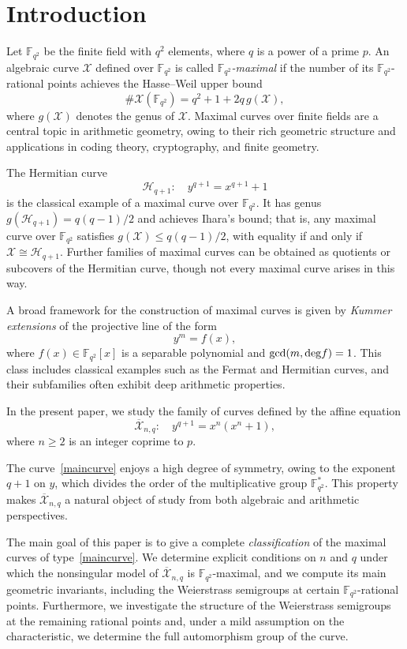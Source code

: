 \documentclass[12pt]{amsart}
\theoremstyle{remark}
\theoremstyle{definition}
\def\cX{\mathcal X}
\def\deg{{\rm deg}}
\begin{document}
	\section{Introduction}
	
	Let $\mathbb{F}_{q^2}$ be the finite field with $q^2$ elements, where 
$q$ is a power of a prime $p$. An algebraic curve $\cX$ defined over 
$\mathbb{F}_{q^2}$ is called \emph{$\mathbb{F}_{q^2}$-maximal} if the 
number of its $\mathbb{F}_{q^2}$-rational points achieves the 
Hasse--Weil upper bound
\[
\# \cX(\mathbb{F}_{q^2}) = q^2 + 1 + 2q\, g(\mathcal{X}),
\]
where $g(\cX)$ denotes the genus of $\cX$. Maximal curves over finite 
fields are a central topic in arithmetic geometry, owing to their rich 
geometric structure and applications in coding theory, cryptography, 
and finite geometry.

The Hermitian curve
\[
\mathcal{H}_{q+1} : \quad y^{q+1} = x^{q+1} + 1
\]
is the classical example of a maximal curve over $\mathbb{F}_{q^2}$.
It has genus $g(\mathcal{H}_{q+1}) = q(q-1)/2$ and achieves Ihara's 
bound; that is, any maximal curve over $\mathbb{F}_{q^2}$ satisfies 
$g(\cX) \le q(q-1)/2$, with equality if and only if 
$\cX \cong \mathcal{H}_{q+1}$. Further families of maximal curves can 
be obtained as quotients or subcovers of the Hermitian curve, though 
not every maximal curve arises in this way.

	A broad framework for the construction of maximal curves is given by 
\emph{Kummer extensions} of the projective line of the form
\[
y^m = f(x),
\]
where $f(x) \in \mathbb{F}_{q^2}[x]$ is a separable polynomial and 
$\gcd(m, \deg f) = 1$. This class includes classical examples such as 
the Fermat and Hermitian curves, and their subfamilies often exhibit 
deep arithmetic properties.

In the present paper, we study the family of curves defined by the 
affine equation
\begin{equation}\label{maincurve}
    \overline{\mathcal{X}}_{n,q} : \quad y^{q+1} = x^n(x^n + 1),
\end{equation}
where $n \ge 2$ is an integer coprime to $p$.

The curve~\eqref{maincurve} enjoys a high degree of symmetry, owing 
to the exponent $q+1$ on $y$, which divides the order of the 
multiplicative group $\mathbb{F}_{q^2}^\ast$. This property makes 
$\overline{\mathcal{X}}_{n,q}$ a natural object of study from both 
algebraic and arithmetic perspectives.

	The main goal of this paper is to give a complete \emph{classification} 
of the maximal curves of type~\eqref{maincurve}. We determine explicit 
conditions on $n$ and $q$ under which the nonsingular model of 
$\overline{\mathcal{X}}_{n,q}$ is $\mathbb{F}_{q^2}$-maximal, and we 
compute its main geometric invariants, including the Weierstrass 
semigroups at certain $\mathbb{F}_{q^2}$-rational points. Furthermore, 
we investigate the structure of the Weierstrass semigroups at the 
remaining rational points and, under a mild assumption on the 
characteristic, we determine the full automorphism group of the curve.
	
\end{document}
